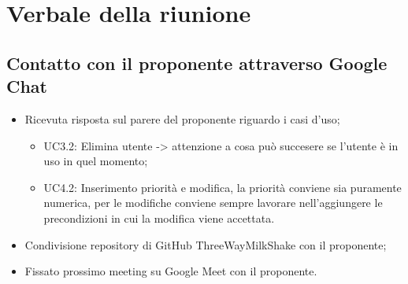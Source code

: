 \section{Verbale della riunione}
	\subsection{Contatto con il proponente attraverso Google Chat}
	\begin{itemize}
		\item Ricevuta risposta sul parere del proponente riguardo i casi d'uso;
			\begin{itemize}
				\item {UC3.2: }Elimina utente -> attenzione a cosa può succesere se l'utente è in uso in quel momento;
				\item {UC4.2: }Inserimento priorità e modifica, la priorità conviene sia puramente numerica, per le modifiche conviene sempre lavorare nell'aggiungere le precondizioni in cui la modifica viene accettata.
			\end{itemize}
		\item Condivisione repository di GitHub ThreeWayMilkShake con il proponente;
		\item Fissato prossimo meeting su Google Meet con il proponente.
	\end{itemize}

